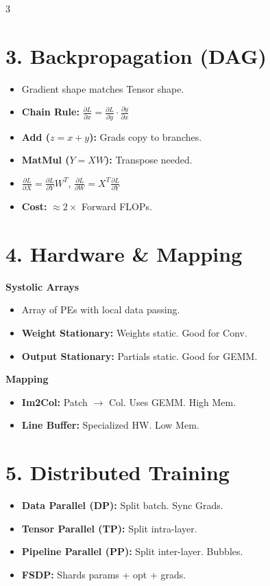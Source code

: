 \documentclass[8pt, a4paper, landscape]{article}
\begin{document}
\begin{multicols*}{3}
\section{3. Backpropagation (DAG)}
\begin{itemize}
    \item Gradient shape matches Tensor shape.
    \item \textbf{Chain Rule:} $\frac{\partial L}{\partial x} = \frac{\partial L}{\partial y} \cdot \frac{\partial y}{\partial x}$
    \item \textbf{Add ($z=x+y$):} Grads copy to branches.
    \item \textbf{MatMul ($Y=XW$):} Transpose needed.
    \item $\frac{\partial L}{\partial X} = \frac{\partial L}{\partial Y} W^T$, $\frac{\partial L}{\partial W} = X^T \frac{\partial L}{\partial Y}$
    \item \textbf{Cost:} $\approx 2 \times$ Forward FLOPs.
\end{itemize}

\section{4. Hardware \& Mapping}
\textbf{Systolic Arrays}
\begin{itemize}
    \item Array of PEs with local data passing.
    \item \textbf{Weight Stationary:} Weights static. Good for Conv.
    \item \textbf{Output Stationary:} Partials static. Good for GEMM.
\end{itemize}
\textbf{Mapping}
\begin{itemize}
    \item \textbf{Im2Col:} Patch $\to$ Col. Uses GEMM. High Mem.
    \item \textbf{Line Buffer:} Specialized HW. Low Mem.
\end{itemize}

\section{5. Distributed Training}
\begin{itemize}
    \item \textbf{Data Parallel (DP):} Split batch. Sync Grads.
    \item \textbf{Tensor Parallel (TP):} Split intra-layer.
    \item \textbf{Pipeline Parallel (PP):} Split inter-layer. Bubbles.
    \item \textbf{FSDP:} Shards params + opt + grads.
\end{itemize}


\end{multicols*}
\end{document}
